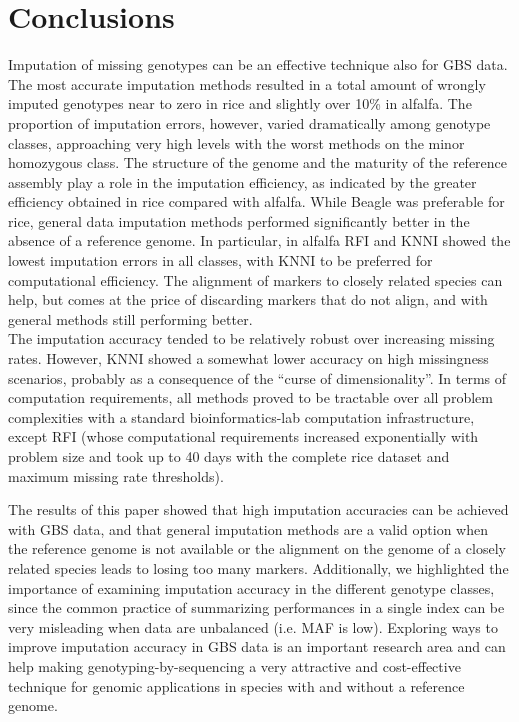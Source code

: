 \makeatletter{}\section{Conclusions}
\label{sec:conclusions}
Imputation of missing genotypes can be an effective technique also for GBS data.
The most accurate imputation methods resulted in a total amount of wrongly imputed genotypes near to zero in rice and slightly over 10\% in alfalfa. 
The proportion of imputation errors, however, varied dramatically among genotype classes, approaching very high levels with the worst methods on the minor homozygous class.
The structure of the genome and the maturity of the reference assembly play a role in the imputation efficiency, as indicated by the greater efficiency obtained in rice compared with alfalfa. While Beagle was preferable for rice, general data imputation methods performed significantly better in the absence of a reference genome. In particular, in alfalfa RFI and KNNI showed the lowest imputation errors in all classes, with KNNI to be preferred for computational efficiency. The alignment of markers to closely related species can help, but comes at the price of discarding markers that do not align, and with general methods still performing better.\\
The imputation accuracy tended to be relatively robust over increasing missing rates. However, KNNI showed a somewhat lower accuracy on high missingness scenarios, probably as a consequence of the ``curse of dimensionality''. In terms of computation requirements, all methods proved to be tractable over all problem complexities with a standard bioinformatics-lab computation infrastructure, except RFI (whose computational requirements increased exponentially with problem size and took up to 40 days with the complete rice dataset and maximum missing rate thresholds).

The results of this paper showed that high imputation accuracies can be achieved with GBS data, and that general imputation methods are a valid option when the reference genome is not available or the alignment on the genome of a closely related species leads to losing too many markers. Additionally, we highlighted the importance of examining imputation accuracy in the different genotype classes, since the common practice of summarizing performances in a single index can be very misleading when data are unbalanced (i.e. MAF is low).
Exploring ways to improve imputation accuracy in GBS data is an important research area and can help making genotyping-by-sequencing a very attractive and cost-effective technique for genomic applications in species with and without a reference genome.



